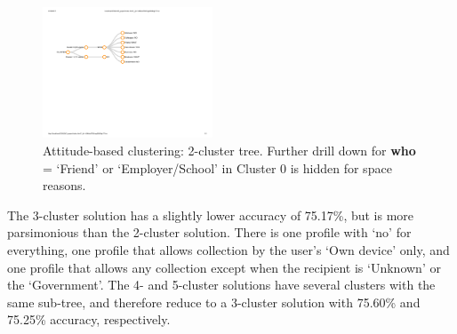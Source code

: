 \begin{figure}
	\centering
	\includegraphics[width=0.45\textwidth]{figures/attitude-based-2.pdf}
	\caption{Attitude-based clustering: 2-cluster tree. Further drill down for \textbf{who} = `Friend' or `Employer/School' in Cluster 0 is hidden for space reasons.}
	\label{fig:2clusters}
\end{figure}

The 3-cluster solution has a slightly lower accuracy of 75.17\%, but is more parsimonious than the 2-cluster solution. There is one profile with `no' for everything, one profile that allows collection by the user's `Own device' only, and one profile that allows any collection except when the recipient is `Unknown' or the `Government'. The 4- and 5-cluster solutions have several clusters with the same sub-tree, and therefore reduce to a 3-cluster solution with 75.60\% and 75.25\% accuracy, respectively.




